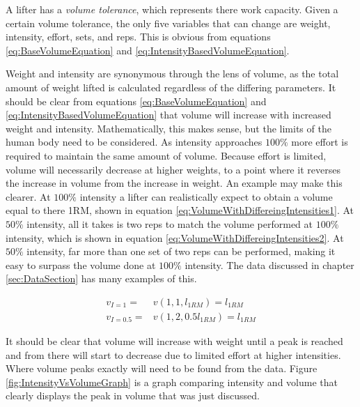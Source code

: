 A lifter has a \textit{volume tolerance}, which represents there work capacity. Given a certain volume tolerance, the only five variables that can change are weight, intensity, effort, sets, and reps. This is obvious from equations \ref{eq:BaseVolumeEquation} and \ref{eq:IntensityBasedVolumeEquation}.

Weight and intensity are synonymous through the lens of volume, as the total amount of weight lifted is calculated regardless of the differing parameters. It should be clear from equations \ref{eq:BaseVolumeEquation} and \ref{eq:IntensityBasedVolumeEquation} that volume will increase with increased weight and intensity. Mathematically, this makes sense, but the limits of the human body need to be considered. As intensity approaches $100\%$ more effort is required to maintain the same amount of volume. Because effort is limited, volume will necessarily decrease at higher weights, to a point where it reverses the increase in volume from the increase in weight. An example may make this clearer. At $100\%$ intensity a lifter can realistically expect to obtain a volume equal to there 1RM, shown in equation \ref{eq:VolumeWithDiffereingIntensities1}. At $50\%$ intensity, all it takes is two reps to match the volume performed at $100\%$ intensity, which is shown in equation \ref{eq:VolumeWithDiffereingIntensities2}. At $50\%$ intensity, far more than one set of two reps can be performed, making it easy to surpass the volume done at $100\%$ intensity. The data discussed in chapter \ref{sec:DataSection} has many examples of this.

\begin{subequations}
    \begin{align}
        \label{eq:VolumeWithDiffereingIntensities1}
        v_{I=1}=&v(1,1,l_{1RM})=l_{1RM} \\
        \label{eq:VolumeWithDiffereingIntensities2}
        v_{I=0.5}=&v(1,2,0.5l_{1RM})=l_{1RM}
    \end{align}
\end{subequations}

It should be clear that volume will increase with weight until a peak is reached and from there will start to decrease due to limited effort at higher intensities. Where volume peaks exactly will need to be found from the data. Figure \ref{fig:IntensityVsVolumeGraph} is a graph comparing intensity and volume that clearly displays the peak in volume that was just discussed.

